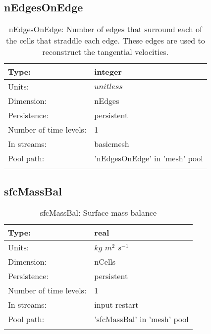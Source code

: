 \subsection[nEdgesOnEdge]{nEdgesOnEdge}
\label{subsec:var_sec_mesh_nEdgesOnEdge}
\begin{center}
\begin{longtable}{| p{2.0in} | p{4.0in} |}
        \hline 
        Type: & integer \\
        \hline 
        Units: & $unitless$ \\
        \hline 
        Dimension: & nEdges \\
        \hline 
        Persistence: & persistent \\
        \hline 
        Number of time levels: & 1 \\
        \hline 
		 In streams: &  basicmesh \\
        \hline 
            Pool path: & 'nEdgesOnEdge' in 'mesh' pool
 \\
		 \hline 
    \caption{nEdgesOnEdge: Number of edges that surround each of the cells that straddle each edge. These edges are used to reconstruct the tangential velocities.}
\end{longtable}
\end{center}
\subsection[sfcMassBal]{sfcMassBal}
\label{subsec:var_sec_mesh_sfcMassBal}
\begin{center}
\begin{longtable}{| p{2.0in} | p{4.0in} |}
        \hline 
        Type: & real \\
        \hline 
        Units: & $kg$ $m^2$ $s^{-1}$ \\
        \hline 
        Dimension: & nCells \\
        \hline 
        Persistence: & persistent \\
        \hline 
        Number of time levels: & 1 \\
        \hline 
		 In streams: &  input restart \\
        \hline 
            Pool path: & 'sfcMassBal' in 'mesh' pool
 \\
		 \hline 
    \caption{sfcMassBal: Surface mass balance}
\end{longtable}
\end{center}
